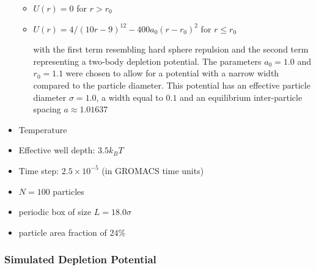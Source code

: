 \documentclass[11pt]{article}
\begin{document}
\begin{itemize}
\begin{itemize}
\item $U(r)=0$ for $r > r_0$\\
\label{sec-2.3.3.3.2}


\item $U(r)=4/(10r-9)^{12} -  400 a_0 (r-r_0)^2$ for $r \le r_0$\\
\label{sec-2.3.3.3.3}

with the first term resembling hard sphere repulsion and the second term  representing a two-body depletion potential. The parameters $a_0=1.0$ and $r_0=1.1$ were chosen to allow for  a potential with a narrow width compared to the particle diameter. This potential has an effective particle diameter $\sigma=1.0$,  a width equal to $0.1$ and an equilibrium inter-particle spacing $a \approx 1.01637$
\end{itemize} %

\item Temperature\\
\label{sec-2.3.3.4}


\item Effective well depth: $3.5 k_B T$\\
\label{sec-2.3.3.5}


\item Time step: $2.5 \times 10^{-5}$ (in GROMACS time units)\\
\label{sec-2.3.3.6}


\item $N=100$ particles\\
\label{sec-2.3.3.7}


\item periodic box of size $L = 18.0 \sigma$\\
\label{sec-2.3.3.8}


\item particle area fraction of $24\%$\\
\label{sec-2.3.3.9}


\end{itemize} %
\subsubsection{Simulated Depletion Potential}
\label{sec-2.3.4}
\end{document}
